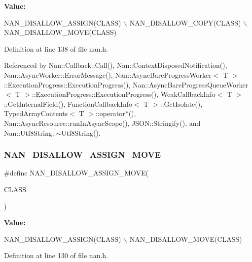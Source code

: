 {\bfseries Value\+:}
\begin{DoxyCode}
NAN_DISALLOW_ASSIGN(CLASS)                                                 \(\backslash\)
    NAN\_DISALLOW\_COPY(CLASS)                                                   \(\backslash\)
    NAN\_DISALLOW\_MOVE(CLASS)
\end{DoxyCode}


Definition at line 138 of file nan.\+h.



Referenced by Nan\+::\+Callback\+::\+Call(), Nan\+::\+Context\+Disposed\+Notification(), Nan\+::\+Async\+Worker\+::\+Error\+Message(), Nan\+::\+Async\+Bare\+Progress\+Worker$<$ T $>$\+::\+Execution\+Progress\+::\+Execution\+Progress(), Nan\+::\+Async\+Bare\+Progress\+Queue\+Worker$<$ T $>$\+::\+Execution\+Progress\+::\+Execution\+Progress(), Weak\+Callback\+Info$<$ T $>$\+::\+Get\+Internal\+Field(), Function\+Callback\+Info$<$ T $>$\+::\+Get\+Isolate(), Typed\+Array\+Contents$<$ T $>$\+::operator$\ast$(), Nan\+::\+Async\+Resource\+::run\+In\+Async\+Scope(), J\+S\+O\+N\+::\+Stringify(), and Nan\+::\+Utf8\+String\+::$\sim$\+Utf8\+String().

\mbox{\label{nan_8h_a5c654df3d1b36c4639b88db0368237d8}} 
\subsubsection{N\+A\+N\+\_\+\+D\+I\+S\+A\+L\+L\+O\+W\+\_\+\+A\+S\+S\+I\+G\+N\+\_\+\+M\+O\+VE}
{\footnotesize\ttfamily \#define N\+A\+N\+\_\+\+D\+I\+S\+A\+L\+L\+O\+W\+\_\+\+A\+S\+S\+I\+G\+N\+\_\+\+M\+O\+VE(\begin{DoxyParamCaption}\item[{}]{C\+L\+A\+SS }\end{DoxyParamCaption})}

{\bfseries Value\+:}
\begin{DoxyCode}
NAN_DISALLOW_ASSIGN(CLASS)                                                 \(\backslash\)
    NAN\_DISALLOW\_MOVE(CLASS)
\end{DoxyCode}


Definition at line 130 of file nan.\+h.

